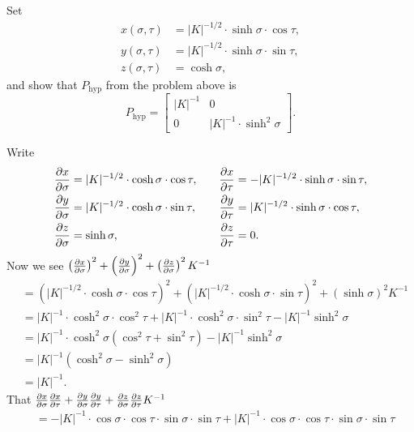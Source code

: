 \documentclass{ximera}
\begin{document}
\begin{problem}
  Set
  \begin{align*}
    x(\sigma,\tau) &=|K|^{-1/2}\cdot \sinh\sigma\cdot \cos \tau,\\
    y(\sigma,\tau) &=|K|^{-1/2}\cdot \sinh\sigma\cdot \sin\tau,\\
    z(\sigma,\tau) &=\cosh\sigma,
  \end{align*}
  and show that $P_\mathrm{hyp}$ from the problem above is
  \[
  P_\mathrm{hyp} =
  \begin{bmatrix}
    |K|^{-1} & 0 \\
    0 &  |K|^{-1}\cdot\sinh^2 \sigma
  \end{bmatrix}.
  \]
  \begin{freeResponse}
    Write
    \[
    \begin{split}
      \pp[x]{\sigma} &= |K|^{-1/2}\cdot \cosh\sigma\cdot \cos \tau, \\
      \pp[y]{\sigma} &= |K|^{-1/2}\cdot \cosh\sigma\cdot \sin\tau,\\
      \pp[z]{\sigma} &= \sinh\sigma,
    \end{split}
    \qquad
    \begin{split}
      \pp[x]{\tau} &= -|K|^{-1/2}\cdot \sinh\sigma\cdot \sin \tau,\\
      \pp[y]{\tau} &= |K|^{-1/2}\cdot \sinh\sigma\cdot \cos\tau,\\
      \pp[z]{\tau} &= 0. 
    \end{split}
    \]
    Now we see $\left(\pp[x]{\sigma}\right)^2 + \left(\pp[y]{\sigma}\right)^2 + \left(\pp[z]{\sigma}\right)^2K^{-1}$
    \begin{align*}
      &= \left(|K|^{-1/2}\cdot \cosh\sigma\cdot \cos \tau \right)^2 + \left(|K|^{-1/2}\cdot \cosh\sigma\cdot \sin\tau\right)^2 + \left(\sinh\sigma\right)^2K^{-1}\\
      &= |K|^{-1}\cdot \cosh^2\sigma\cdot \cos^2 \tau + |K|^{-1}\cdot \cosh^2\sigma\cdot \sin^2\tau - |K|^{-1} \sinh^2\sigma \\
      &= |K|^{-1}\cdot \cosh^2\sigma\left(\cos^2 \tau + \sin^2\tau\right) -|K|^{-1} \sinh^2\sigma \\
      &= |K|^{-1}\left(\cosh^2\sigma -\sinh^2\sigma\right) \\
      &= |K|^{-1}.
    \end{align*}
    That $\pp[x]{\sigma}\pp[x]{\tau} + \pp[y]{\sigma}\pp[y]{\tau} + \pp[z]{\sigma}\pp[z]{\tau} K^{-1}$
    \begin{align*}
      &= -|K|^{-1}\cdot \cos\sigma\cdot \cos \tau \cdot \sin\sigma\cdot \sin \tau + |K|^{-1}\cdot \cos\sigma\cdot \cos \tau \cdot \sin\sigma\cdot \sin \tau\\

\end{align*}
\end{freeResponse}
\end{problem}
\end{document}
